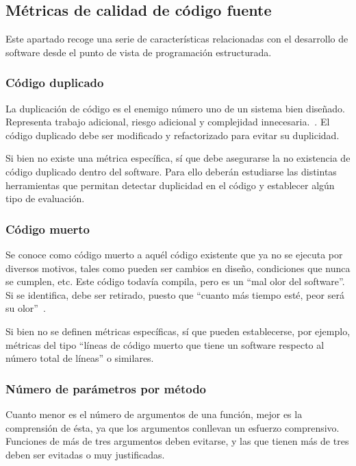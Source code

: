 \documentclass[11pt]{article}
\begin{document}
\subsection{Métricas de calidad de código fuente}

Este apartado recoge una serie de características relacionadas con el desarrollo de software desde el punto de vista de programación estructurada. 

\subsubsection{Código duplicado}

La duplicación de código es el enemigo número uno de un sistema bien diseñado. Representa trabajo adicional, riesgo adicional y complejidad innecesaria.~\cite{unclebob:cleancode}. El código duplicado debe ser modificado y refactorizado para evitar su duplicidad.

Si bien no existe una métrica específica, sí que debe asegurarse la no existencia de código duplicado dentro del software. Para ello deberán estudiarse las distintas herramientas que permitan detectar duplicidad en el código y establecer algún tipo de evaluación.

\subsubsection{Código muerto}
Se conoce como código muerto a aquél código existente que ya no se ejecuta por diversos motivos, tales como pueden ser cambios en diseño, condiciones que nunca se cumplen, etc. Este código todavía compila, pero es un ``mal olor del software''. Si se identifica, debe ser retirado, puesto que ``cuanto más tiempo esté, peor será su olor''~\cite{unclebob:cleancode}.

Si bien no se definen métricas específicas, sí que pueden establecerse, por ejemplo, métricas del tipo ``líneas de código muerto que tiene un software respecto al número total de líneas'' o similares.

\subsubsection{Número de parámetros por método}

Cuanto menor es el número de argumentos de una función, mejor es la comprensión de ésta, ya que los argumentos conllevan un esfuerzo comprensivo. Funciones de más de tres argumentos deben evitarse, y las que tienen más de tres deben ser evitadas o muy justificadas.
\end{document}
